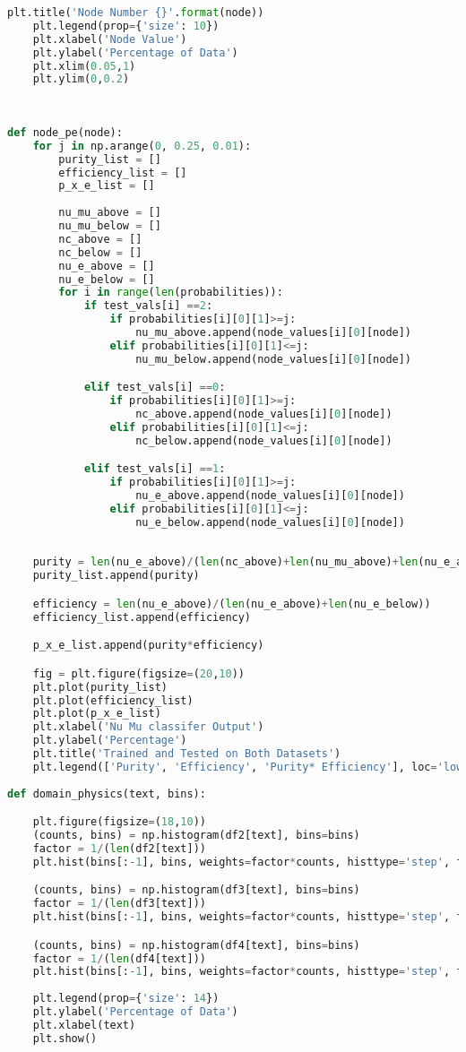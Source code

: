 \begin{lstlisting}[language=Python]
    plt.title('Node Number {}'.format(node))
    plt.legend(prop={'size': 10})
    plt.xlabel('Node Value')
    plt.ylabel('Percentage of Data')
    plt.xlim(0.05,1)
    plt.ylim(0,0.2)
    
    
    
def node_pe(node):
    for j in np.arange(0, 0.25, 0.01):
        purity_list = []
        efficiency_list = []
        p_x_e_list = []
        
        nu_mu_above = []
        nu_mu_below = []
        nc_above = []
        nc_below = []
        nu_e_above = []
        nu_e_below = []
        for i in range(len(probabilities)):
            if test_vals[i] ==2:
                if probabilities[i][0][1]>=j:
                    nu_mu_above.append(node_values[i][0][node])
                elif probabilities[i][0][1]<=j:
                    nu_mu_below.append(node_values[i][0][node])

            elif test_vals[i] ==0:         
                if probabilities[i][0][1]>=j:
                    nc_above.append(node_values[i][0][node])
                elif probabilities[i][0][1]<=j:
                    nc_below.append(node_values[i][0][node])

            elif test_vals[i] ==1:        
                if probabilities[i][0][1]>=j:
                    nu_e_above.append(node_values[i][0][node])
                elif probabilities[i][0][1]<=j:
                    nu_e_below.append(node_values[i][0][node])
                    
                    
    purity = len(nu_e_above)/(len(nc_above)+len(nu_mu_above)+len(nu_e_above))
    purity_list.append(purity)

    efficiency = len(nu_e_above)/(len(nu_e_above)+len(nu_e_below))
    efficiency_list.append(efficiency)

    p_x_e_list.append(purity*efficiency)

    fig = plt.figure(figsize=(20,10))
    plt.plot(purity_list)
    plt.plot(efficiency_list)
    plt.plot(p_x_e_list)
    plt.xlabel('Nu Mu classifer Output')
    plt.ylabel('Percentage')
    plt.title('Trained and Tested on Both Datasets')
    plt.legend(['Purity', 'Efficiency', 'Purity* Efficiency'], loc='lower left')
    
def domain_physics(text, bins):

    plt.figure(figsize=(18,10))
    (counts, bins) = np.histogram(df2[text], bins=bins)
    factor = 1/(len(df2[text]))
    plt.hist(bins[:-1], bins, weights=factor*counts, histtype='step', fill=False, label='Gibuu<0.2')

    (counts, bins) = np.histogram(df3[text], bins=bins)
    factor = 1/(len(df3[text]))
    plt.hist(bins[:-1], bins, weights=factor*counts, histtype='step', fill=False, label= 'Genie<0.2')

    (counts, bins) = np.histogram(df4[text], bins=bins)
    factor = 1/(len(df4[text]))
    plt.hist(bins[:-1], bins, weights=factor*counts, histtype='step', fill=False, label='0.4<Gibuu<0.7')
    
    plt.legend(prop={'size': 14})
    plt.ylabel('Percentage of Data')
    plt.xlabel(text)
    plt.show()

\end{lstlisting}